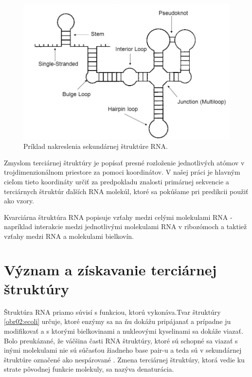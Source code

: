 \begin{figure}%
\includegraphics[width=\textwidth]{../img/secondary_structure}
\caption{Príklad nakreslenia sekundárnej štruktúre RNA. \cite{Eddy04}}
\label{obr01:secstru}
\end{figure}


\indent Zmyslom terciárnej štruktúry je popísať presné rozloženie jednotlivých atómov v trojdimenzionálnom priestore za pomoci koordinátov. V našej práci je hlavným cieľom tieto koordináty určiť za predpokladu znalosti primárnej sekvencie a terciárnych štruktúr ďalších RNA molekúl, ktoré sa pokúšame pri predikcii použiť ako vzory. 


\indent Kvarciárna štruktúra RNA popisuje vzťahy medzi celými molekulami RNA -
napríklad interakcie medzi jednotlivými molekulami RNA v ribozómoch \cite{Noller84} a taktiež vzťahy medzi RNA a molekulami bielkovín.

\section{Význam a získavanie terciárnej štruktúry}
Štruktúra RNA priamo súvisí s funkciou, ktorú vykonáva.Tvar štruktúry \ref{obr02:ecoli} určuje, ktoré enzýmy sa na ňu dokážu pripájanať a prípadne ju modifikovať a s ktorými bielkovinami a nukleovými kyselinami sa dokáže viazať. Bolo preukázané, že váčšina časti RNA štruktúry, ktoré sú schopné sa viazať s inými molekulami nie sú súčasťou žiadneho base pair-u a teda sú v sekundárnej štruktúre označené ako nespárované \cite{Schudoma10}. Zmena
terciárnej štruktúry, ktorá vedie ku strate pôvodnej funkcie molekuly, sa nazýva denaturácia.

